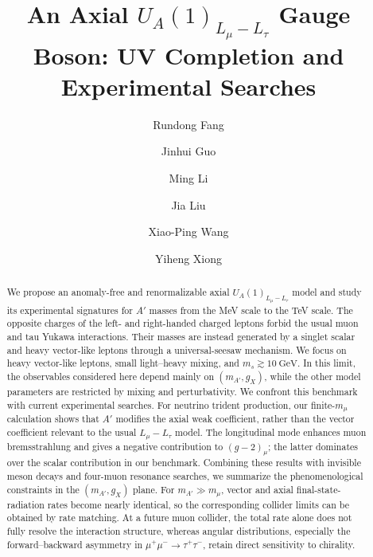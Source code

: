\documentclass[onecolumn, aps, nofootinbib, prd, preprint, floats, floatfix, amsmath, amssymb, superscriptaddress, preprintnumbers]{revtex4-2}
\begin{document}
\title{An Axial $U_A(1)_{L_\mu-L_\tau}$ Gauge Boson: UV Completion and Experimental Searches}

\author{Rundong Fang}

\author{Jinhui Guo}

\author{Ming Li }

\author{Jia Liu }

\author{Xiao-Ping Wang  }

\author{Yiheng Xiong  }

\begin{abstract}
We propose an anomaly-free and renormalizable axial $U_A(1)_{L_\mu-L_\tau}$ model and study its experimental signatures for $A'$ masses from the MeV scale to the TeV scale. The opposite charges of the left- and right-handed charged leptons forbid the usual muon and tau Yukawa interactions. Their masses are instead generated by a singlet scalar and heavy vector-like leptons through a universal-seesaw mechanism. We focus on heavy vector-like leptons, small light--heavy mixing, and $m_s\gtrsim10~\mathrm{GeV}$. In this limit, the observables considered here depend mainly on $(m_{A'},g_X)$, while the other model parameters are restricted by mixing and perturbativity. We confront this benchmark with current experimental searches. For neutrino trident production, our finite-$m_\mu$ calculation shows that $A'$ modifies the axial weak coefficient, rather than the vector coefficient relevant to the usual $L_\mu-L_\tau$ model. The longitudinal mode enhances muon bremsstrahlung and gives a negative contribution to $(g-2)_\mu$; the latter dominates over the scalar contribution in our benchmark. Combining these results with invisible meson decays and four-muon resonance searches, we summarize the phenomenological constraints in the $(m_{A'},g_X)$ plane. For $m_{A'}\gg m_\mu$, vector and axial final-state-radiation rates become nearly identical, so the corresponding collider limits can be obtained by rate matching. At a future muon collider, the total rate alone does not fully resolve the interaction structure, whereas angular distributions, especially the forward--backward asymmetry in $\mu^+\mu^-\to\tau^+\tau^-$, retain direct sensitivity to chirality.
\end{abstract}
\end{document}
